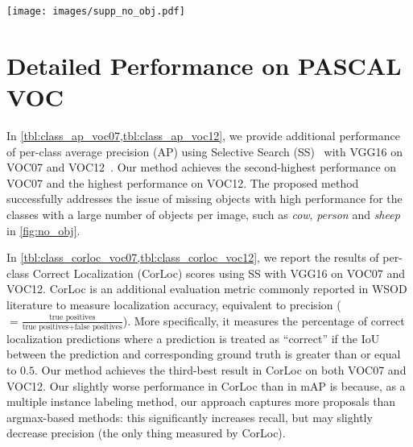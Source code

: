 \documentclass[runningheads]{llncs}
\begin{document}
\setcounter{equation}{6}
\setcounter{figure}{6}
\setcounter{table}{3}

\begin{figure*}[b!]
\centering
\texttt{[image: images/supp\_no\_obj.pdf]}
\caption{Analysis of a number of objects per image on PASCAL VOC datasets.}
\label{fig:no_obj}
\vspace*{-10mm}
\end{figure*}

\section{Detailed Performance on PASCAL VOC}
\label{sec:performance_voc}
In \cref{tbl:class_ap_voc07,tbl:class_ap_voc12}, we provide additional performance of per-class average precision (AP) using Selective Search (SS)~\cite{uijlings2013selective} with VGG16 on VOC07 and VOC12~\cite{Everingham15}. 
Our method achieves the second-highest performance on VOC07 and the highest performance on VOC12.
The proposed method successfully addresses the issue of missing objects with high performance for the classes with a large number of objects per image, such as \textit{cow}, \textit{person} and \textit{sheep} in \cref{fig:no_obj}.

In \cref{tbl:class_corloc_voc07,tbl:class_corloc_voc12}, we report the results of per-class Correct Localization (CorLoc) scores using SS with VGG16 on VOC07 and VOC12. 
CorLoc is an additional evaluation metric commonly reported in WSOD literature to measure localization accuracy, equivalent to precision ($=\frac{\text{true positives}}{\text{true positives} + \text{false positives}}$).
More specifically, it measures the percentage of correct localization predictions where a prediction is treated as ``correct'' if the IoU between the prediction and corresponding ground truth is greater than or equal to $0.5$.
Our method achieves the third-best result in CorLoc on both VOC07 and VOC12.
Our slightly worse performance in CorLoc than in mAP is because, as a multiple instance labeling method, our approach captures more proposals than argmax-based methods: this significantly increases recall, but may slightly decrease precision (the only thing measured by CorLoc).
\end{document}
